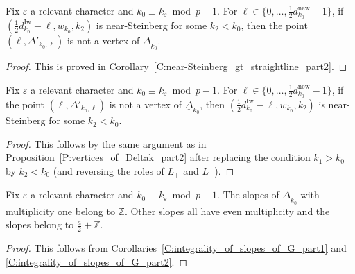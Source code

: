 \begin{proposition}
    \label{P:vertices_of_Deltak_part3}
    Fix $\varepsilon$ a relevant character and $k_0 \equiv k_\varepsilon \bmod p-1$.
    For $\ell \in\{0, \dots, \frac12d_{k_0}^{\mathrm{new}}-1\}$, if $(\frac 12d_{k_0}^{\mathrm{Iw}}- \ell, w_{k_0}, k_2)$ is near-Steinberg for some $k_2 < {k_0}$, then the point $(\ell, \Delta'_{{k_0},\ell})$ is not a vertex of $\underline \Delta_{k_0}$.
\end{proposition}

\begin{proof}
    This is proved in Corollary~\ref{C:near-Steinberg_gt_straightline_part2}.
\end{proof}

\begin{proposition}
    \label{P:vertices_of_Deltak_part4}
    Fix $\varepsilon$ a relevant character and $k_0 \equiv k_\varepsilon \bmod p-1$.
    For $\ell \in\{0, \dots, \frac12d_{k_0}^{\mathrm{new}}-1\}$, if the point $(\ell, \Delta'_{{k_0},\ell})$ is not a vertex of $\underline \Delta_{k_0}$, then $(\frac 12d_{k_0}^{\mathrm{Iw}}- \ell, w_{k_0}, k_2)$ is near-Steinberg for some  $k_2 < {k_0}$.
\end{proposition}

\begin{proof}
    This follows by the same argument as in Proposition~\ref{P:vertices_of_Deltak_part2} after replacing the condition $k_1>k_0$ by $k_2<k_0$ (and reversing the roles of $L_+$ and $L_-$).
\end{proof}

\begin{corollary}
    \label{C:slopes_of_Deltak}
    Fix $\varepsilon$ a relevant character and $k_0 \equiv k_\varepsilon \bmod p-1$.
    The slopes of $\underline \Delta_{k_0}$ with multiplicity one belong to ${\mathbb{Z}}$. Other slopes all have even multiplicity and the slopes belong to $\frac a2 + {\mathbb{Z}}$.
\end{corollary}

\begin{proof}
    This follows from Corollaries~\ref{C:integrality_of_slopes_of_G_part1} and \ref{C:integrality_of_slopes_of_G_part2}.
\end{proof}
